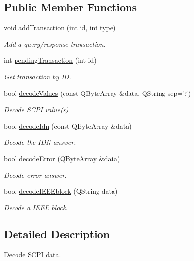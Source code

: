 \subsection*{Public Member Functions}
\begin{DoxyCompactItemize}
\item 
void \hyperlink{classmdt_frame_codec_scpi_a5287ff3f107ca10097cdb499e62f6906}{addTransaction} (int id, int type)
\begin{DoxyCompactList}\small\item\em Add a query/response transaction. \end{DoxyCompactList}\item 
int \hyperlink{classmdt_frame_codec_scpi_aa6f92a37f19983c9a2ef4ba8e10a3581}{pendingTransaction} (int id)
\begin{DoxyCompactList}\small\item\em Get transaction by ID. \end{DoxyCompactList}\item 
bool \hyperlink{classmdt_frame_codec_scpi_a37a1703b6daee6f6bf91c6afb46191b3}{decodeValues} (const QByteArray \&data, QString sep=\char`\"{}:\char`\"{})
\begin{DoxyCompactList}\small\item\em Decode SCPI value(s) \end{DoxyCompactList}\item 
bool \hyperlink{classmdt_frame_codec_scpi_a6ddd1b8e23252dc7f03c279a030cb36f}{decodeIdn} (const QByteArray \&data)
\begin{DoxyCompactList}\small\item\em Decode the IDN answer. \end{DoxyCompactList}\item 
bool \hyperlink{classmdt_frame_codec_scpi_aff616991e6223aa51f265cf7e464be12}{decodeError} (QByteArray \&data)
\begin{DoxyCompactList}\small\item\em Decode error answer. \end{DoxyCompactList}\item 
bool \hyperlink{classmdt_frame_codec_scpi_a327afabbb6da25e31523ef4baa28cc87}{decodeIEEEblock} (QString data)
\begin{DoxyCompactList}\small\item\em Decode a IEEE block. \end{DoxyCompactList}\end{DoxyCompactItemize}


\subsection{Detailed Description}
Decode SCPI data. 

